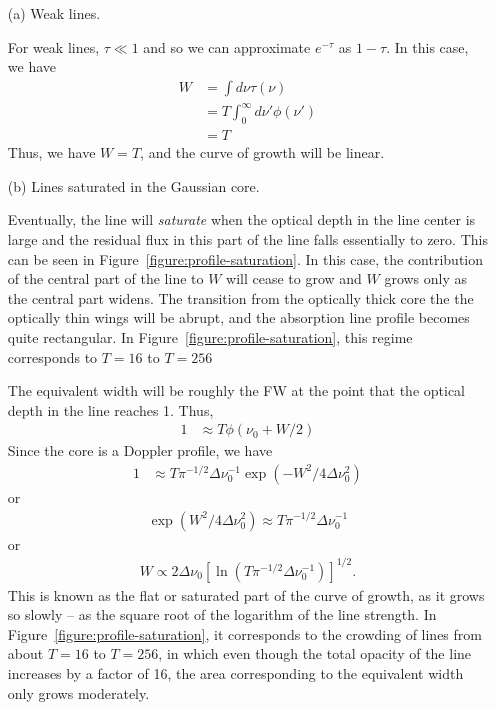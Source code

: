\begin{enumerate}

\newslide

\item[(a)] Weak lines.

For weak lines, $\tau \ll 1$ and so we can approximate
$e^{-\tau}$ as $1 - \tau$. In this case, we
have
\begin{align}
W 
&= \int\!\!\!d\nu \tau(\nu)\\
&= T \int_0^\infty\!\!\!d\nu' \phi(\nu')\\
&= T
\end{align}
Thus, we have $W = T$, and the curve of growth will be linear.

\newslide

\item[(b)] Lines saturated in the Gaussian core.

Eventually, the line will
\emph{saturate} when the optical depth in the line center is large and the residual flux in this part of the line falls essentially to zero. This can be seen in Figure~\ref{figure:profile-saturation}. In this case, the contribution of the central part of the
line to $W$ will cease to grow and $W$ grows only as
the central part widens. The transition from the optically thick core the the optically thin wings will be abrupt, and the absorption line profile becomes quite rectangular. In Figure~\ref{figure:profile-saturation}, this regime corresponds to $T=16$ to $T=256$

The equivalent width will be
roughly the FW at the point that the optical depth in the
line reaches 1. Thus,
\begin{align}
1 &\approx T \phi(\nu_0 + W / 2)
\end{align}
Since the core is a Doppler profile, we have
\begin{align}
1 &\approx T
\pi^{-1/2}\Delta\nu_0^{-1} \exp(-W^2/4\Delta\nu_0^2)
\end{align}
or
\begin{align}
\exp(W^2/4\Delta\nu_0^2) \approx T \pi^{-1/2}\Delta\nu_0^{-1}
\end{align}
or
\begin{align}
W \propto 2 \Delta\nu_0\left[\ln(T \pi^{-1/2}\Delta\nu_0^{-1})\right]^{1/2}.
\end{align}
This is known as the flat or saturated part of the curve of
growth, as it grows so slowly -- as the square root of the logarithm of the line strength. In Figure~\ref{figure:profile-saturation}, it corresponds to the crowding of lines from about $T=16$ to $T=256$, in which even though the total opacity of the line increases by a factor of 16, the area corresponding to the equivalent width only grows moderately.


\end{enumerate}
